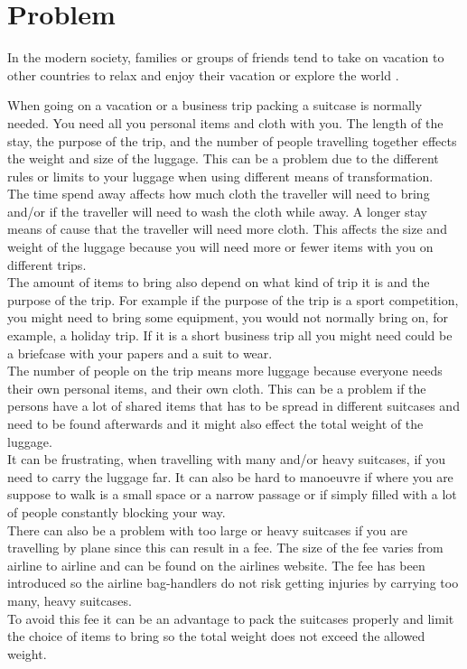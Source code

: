 \section{Problem}
In the modern society, families or groups of friends tend to take on vacation to other countries to relax and enjoy their vacation or explore the world \citep{danskecharter}.

When going on a vacation or a business trip packing a suitcase is normally needed. You need all you personal items and cloth with you. The length of the stay, the purpose of the trip, and the number of people travelling together effects the weight and size of the luggage. This can be a problem due to the different rules or limits to your luggage when using different means of transformation.\\

The time spend away affects how much cloth the traveller will need to bring and/or if the traveller will need to wash the cloth while away. A longer stay means of cause that the traveller will need more cloth. This affects the size and weight of the luggage because you will need more or fewer items with you on different trips.\\
 
The amount of items to bring also depend on what kind of trip it is and the purpose of the trip. For example if the purpose of the trip is a sport competition, you might need to bring some equipment, you would not normally bring on, for example, a holiday trip. If it is a short business trip all you might need could be a briefcase with your papers and a suit to wear.\\

The number of people on the trip means more luggage because everyone needs their own personal items, and their own cloth. This can be a problem if the persons have a lot of shared items that has to be spread in different suitcases and need to be found afterwards and it might also effect the total weight of the luggage.\\

It can be frustrating, when travelling with many and/or heavy suitcases, if you need to carry the luggage far. It can also be hard to manoeuvre if where you are suppose to walk is a small space or a narrow passage or if simply filled with a lot of people constantly blocking your way.\\
 
There can also be a problem with too large or heavy suitcases if you are travelling by plane since this can result in a fee. The size of the fee varies from airline to airline and can be found on the airlines website\citep{altombag}. The fee has been introduced so the airline bag-handlers do not risk getting injuries by carrying too many, heavy suitcases.\\ 
To avoid this fee it can be an advantage to pack the suitcases properly and limit the choice of items to bring so the total weight does not exceed the allowed weight.\\

